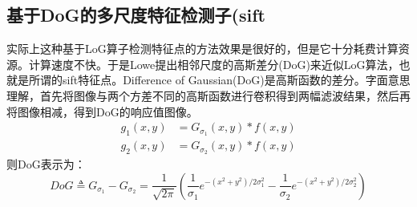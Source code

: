 \subsection{基于DoG的多尺度特征检测子(sift}
实际上这种基于LoG算子检测特征点的方法效果是很好的，但是它十分耗费计算资源。计算速度不快。于是Lowe\cite{lowe2004sift}提出相邻尺度的高斯差分(DoG)来近似LoG算法，也就是所谓的sift特征点。Difference of Gaussian(DoG)是高斯函数的差分。字面意思理解，首先将图像与两个方差不同的高斯函数进行卷积得到两幅滤波结果，然后再将图像相减，得到DoG的响应值图像。
\begin{equation}
\begin{aligned} g_{1}(x, y) &=G_{\sigma_{1}}(x, y) * f(x, y) \\ g_{2}(x, y) &=G_{\sigma_{2}}(x, y) * f(x, y) \end{aligned}
\end{equation}
则DoG表示为：
\begin{equation}
D o G \triangleq G_{\sigma_{1}}-G_{\sigma_{2}}=\frac{1}{\sqrt{2 \pi}}\left(\frac{1}{\sigma_{1}} e^{-\left(x^{2}+y^{2}\right) / 2 \sigma_{1}^{2}}-\frac{1}{\sigma_{2}} e^{-\left(x^{2}+y^{2}\right) / 2 \sigma_{2}^{2}}\right)
\end{equation}
